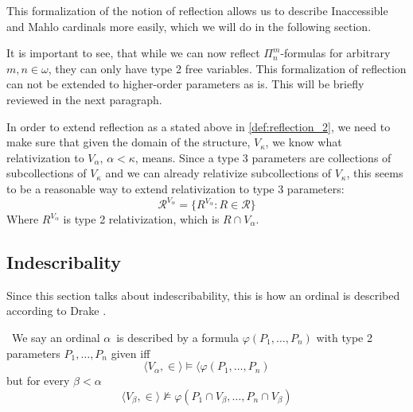 This formalization of the notion of reflection allows us to describe Inaccessible and Mahlo cardinals more easily, which we will do in the following section. 

It is important to see, that while we can now reflect $\Pi^m_n$-formulas for arbitrary $m, n \in \omega$, they can only have type 2 free variables. 
This formalization of reflection can not be extended to higher-order parameters as is. This will be briefly reviewed in the next paragraph.

In order to extend reflection as a stated above in \ref{def:reflection_2}, we need to make sure that given the domain of the structure, $V_\kappa$, we know what relativization to $V_\alpha$, $\alpha < \kappa$, means.
Since a type 3 parameters are collections of subcollections of $V_\kappa$ and we can already relativize subcollections of $V_\kappa$, this seems to be a reasonable way to extend relativization to type 3 parameters:
\begin{equation}
\mathscr{R}^{V_\alpha} = \{R^{V_\alpha} : R \in \mathscr{R} \}
\end{equation}
Where $R^{V_\alpha}$ is type 2 relativization, which is $R \cap V_\alpha$.
\subsection{Indescribality}

Since this section talks about indescribability, this is how an ordinal is described according to Drake \cite[Chapter 9]{DrakeBook}.
\begin{definition}\
We say an ordinal $\alpha$ is described by a formula $\varphi(P_1, \ldots, P_n)$ with type 2 parameters $P_1, \ldots, P_n$ given iff
\begin{equation}
\langle V_\alpha, \in \rangle \models \langle \varphi(P_1, \ldots, P_n)
\end{equation}
but for every $\beta < \alpha$
\begin{equation}
\langle V_\beta, \in \rangle \not\models \varphi(P_1 \cap V_\beta, \ldots, P_n \cap V_\beta)
\end{equation}
\end{definition}

